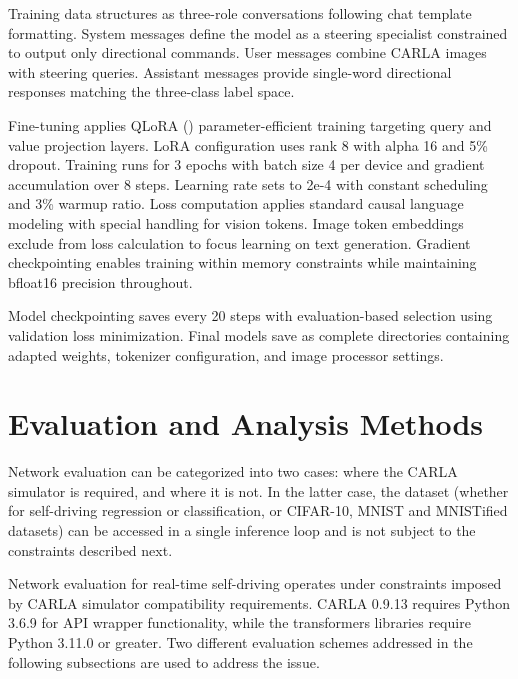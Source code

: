 Training data structures as three-role conversations following chat template formatting. System messages define the model as a steering specialist constrained to output only directional commands. User messages combine CARLA images with steering queries. Assistant messages provide single-word directional responses matching the three-class label space.

Fine-tuning applies QLoRA (\cite{dettmers2023qlora}) parameter-efficient training targeting query and value projection layers. LoRA \cite{hu2021lora} configuration uses rank 8 with alpha 16 and 5\% dropout. Training runs for 3 epochs with batch size 4 per device and gradient accumulation over 8 steps. Learning rate sets to 2e-4 with constant scheduling and 3\% warmup ratio.
Loss computation applies standard causal language modeling with special handling for vision tokens. Image token embeddings exclude from loss calculation to focus learning on text generation. Gradient checkpointing enables training within memory constraints while maintaining bfloat16 precision throughout.

Model checkpointing saves every 20 steps with evaluation-based selection using validation loss minimization. Final models save as complete directories containing adapted weights, tokenizer configuration, and image processor settings.


\section{Evaluation and Analysis Methods}

Network evaluation can be categorized into two cases: where the CARLA simulator is required, and where it is not. In the latter case, the dataset (whether for self-driving regression or classification, or CIFAR-10, MNIST and MNISTified datasets) can be accessed in a single inference loop and is not subject to the constraints described next.

Network evaluation for real-time self-driving operates under constraints imposed by CARLA simulator compatibility requirements. CARLA 0.9.13 requires Python 3.6.9 for API wrapper functionality, while the transformers libraries require Python 3.11.0 or greater. Two different evaluation schemes addressed in the following subsections are used to address the issue.


